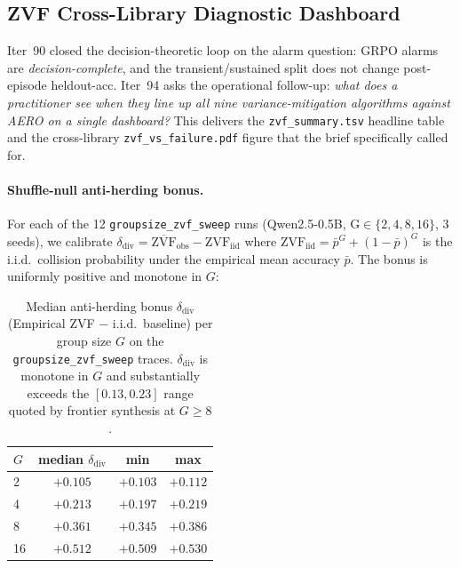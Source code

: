
\subsection{ZVF Cross-Library Diagnostic Dashboard}
\label{sec:zvf-dashboard}

Iter~90 closed the decision-theoretic loop on the alarm question: GRPO
alarms are \emph{decision-complete}, and the transient/sustained split
does not change post-episode heldout-acc. Iter~94 asks the operational
follow-up: \emph{what does a practitioner see when they line up all nine
variance-mitigation algorithms against AERO on a single dashboard?}
This delivers the \texttt{zvf\_summary.tsv} headline table and the
cross-library \texttt{zvf\_vs\_failure.pdf} figure that the brief
specifically called for.

\paragraph{Shuffle-null anti-herding bonus.}
For each of the 12 \texttt{groupsize\_zvf\_sweep} runs (Qwen2.5-0.5B,
G$\in\{2,4,8,16\}$, 3 seeds), we calibrate
$\delta_{\mathrm{div}} = \overline{\mathrm{ZVF}}_{\mathrm{obs}} -
\mathrm{ZVF}_{\mathrm{iid}}$ where
$\mathrm{ZVF}_{\mathrm{iid}} = \bar p^{G} + (1-\bar p)^{G}$ is the
i.i.d.\ collision probability under the empirical mean accuracy
$\bar p$. The bonus is uniformly positive and monotone in $G$:

\begin{table}[ht]\centering\small
\begin{tabular}{lccc}
\toprule
$G$ & median $\delta_{\mathrm{div}}$ & min & max \\
\midrule
2  & $+0.105$ & $+0.103$ & $+0.112$ \\
4  & $+0.213$ & $+0.197$ & $+0.219$ \\
8  & $+0.361$ & $+0.345$ & $+0.386$ \\
16 & $+0.512$ & $+0.509$ & $+0.530$ \\
\bottomrule
\end{tabular}
\caption{Median anti-herding bonus $\delta_{\mathrm{div}}$
(Empirical ZVF $-$ i.i.d.\ baseline) per group size $G$ on the
\texttt{groupsize\_zvf\_sweep} traces. $\delta_{\mathrm{div}}$ is
monotone in $G$ and substantially exceeds the $[0.13, 0.23]$ range
quoted by frontier synthesis at $G \ge 8$.}
\label{tab:zvf-antitherding}
\end{table}

